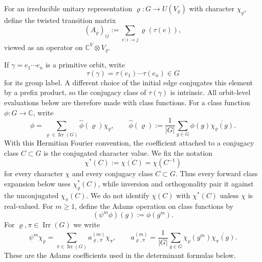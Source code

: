 \documentclass[11pt,a4paper]{amsart}
\theoremstyle{plain}
\theoremstyle{definition}
\theoremstyle{remark}
\DeclareMathOperator{\Irr}{Irr}
\newcommand{\CC}{\mathbb{C}}
\begin{document}
For an irreducible unitary representation
\(\varrho:G\to U(V_\varrho)\) with character \(\chi_\varrho\), define
the twisted transition matrix
\begin{equation}\label{eq:twisted-matrix-def}
  (A_\varrho)_{ij}:=\sum_{e:i\to j}\varrho(\tau(e)),
\end{equation}
viewed as an operator on \(\CC^V\otimes V_\varrho\).

If \(\gamma=e_1\cdots e_n\) is a primitive orbit, write
\[
  \tau(\gamma)=\tau(e_1)\cdots\tau(e_n)\in G
\]
for its group label. A different choice of the initial edge conjugates
this element by a prefix product, so the conjugacy class of
\(\tau(\gamma)\) is intrinsic. All orbit-level evaluations below are
therefore made with class functions. For a class function
\(\phi:G\to\CC\), write
\begin{equation}\label{eq:class-function-fourier}
  \phi
  =\sum_{\varrho\in\Irr(G)}\widehat\phi(\varrho)\chi_\varrho,
  \qquad
  \widehat\phi(\varrho)
  :=\frac{1}{|G|}\sum_{g\in G}\phi(g)\overline{\chi_\varrho(g)}.
\end{equation}
With this Hermitian Fourier convention, the coefficient attached to a
conjugacy class \(C\subset G\) is the conjugated character value. We
fix the notation
\[
  \chi^\ast(C):=\overline{\chi(C)}=\chi(C^{-1})
\]
for every character \(\chi\) and every conjugacy class \(C\subset G\).
Thus every forward class expansion below uses \(\chi_\varrho^\ast(C)\),
while inversion and orthogonality pair it against the unconjugated
\(\chi_\pi(C)\). We do not identify \(\chi(C)\) with \(\chi^\ast(C)\)
unless \(\chi\) is real-valued.
For \(m\ge 1\), define the Adams operation on class functions by
\begin{equation}\label{eq:adams-class-function}
  (\psi^m\phi)(g):=\phi(g^m).
\end{equation}
For \(\varrho,\pi\in\Irr(G)\) we write
\begin{equation}\label{eq:prelim-adams-character-coefficients}
  \psi^m\chi_\varrho
  =\sum_{\pi\in\Irr(G)}a_{\varrho,\pi}^{(m)}\chi_\pi,
  \qquad
  a_{\varrho,\pi}^{(m)}
  =\frac{1}{|G|}\sum_{g\in G}
    \chi_\varrho(g^m)\overline{\chi_\pi(g)} .
\end{equation}
These are the Adams coefficients used in the determinant formulas below.
\end{document}
